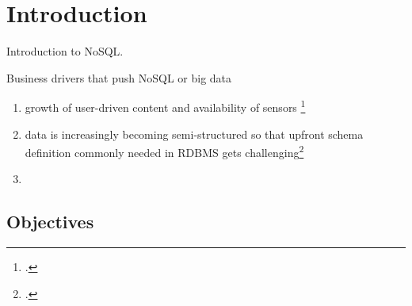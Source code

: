 \newpage

\listoftables
{}
\newpage


\listoffigures
{}
\newpage

\listoflistings
{}
\newpage

\renewcommand{\thepage}{\arabic{page}}

\setcounter{page}{1} 


\section{Introduction}
\label{sec:introduction}

Introduction to NoSQL.

Business drivers that push NoSQL or big data
\begin{enumerate}
  \item growth of user-driven content and availability of sensors
  \footcite[Cf.][XVII]{Tiwari_2011}
  \item data is increasingly becoming semi-structured so that upfront schema
  definition commonly needed in RDBMS gets
  challenging\footcite[Cf.][XVII]{Tiwari_2011}
  \item 
\end{enumerate}



\subsection{Objectives}
\label{sec:objectives}

